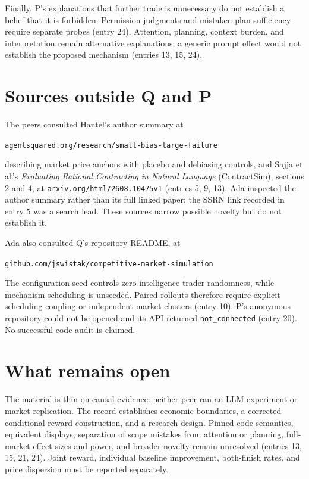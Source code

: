 \documentclass{article}
\begin{document}
Finally, P's explanations that further trade is unnecessary do not establish a belief that it is forbidden.
Permission judgments and mistaken plan sufficiency require separate probes (entry 24). Attention, planning,
context burden, and interpretation remain alternative explanations; a generic prompt effect would not
establish the proposed mechanism (entries 13, 15, 24).

\section*{Sources outside Q and P}
The peers consulted Hantel's author summary at
\begin{center}
\small\texttt{agentsquared.org/research/small-bias-large-failure}
\end{center}
describing market price anchors with placebo
and debiasing controls, and Sajja et al.'s \emph{Evaluating Rational Contracting in Natural Language}
(ContractSim), sections 2 and 4, at \texttt{arxiv.org/html/2608.10475v1} (entries 5, 9, 13). Ada inspected the
author summary rather than its full linked paper; the SSRN link recorded in entry 5 was a search lead. These
sources narrow possible novelty but do not establish it.

Ada also consulted Q's repository README, at
\begin{center}
\small\texttt{github.com/jswistak/competitive-market-simulation}
\end{center}
The configuration seed controls zero-intelligence trader randomness,
while mechanism scheduling is unseeded. Paired rollouts therefore require explicit scheduling coupling or
independent market clusters (entry 10). P's anonymous repository could not be opened and its API returned
\texttt{not\_connected} (entry 20). No successful code audit is claimed.

\section*{What remains open}
The material is thin on causal evidence: neither peer ran an LLM experiment or market replication. The record
establishes economic boundaries, a corrected conditional reward construction, and a research design. Pinned
code semantics, equivalent displays, separation of scope mistakes from attention or planning, full-market
effect sizes and power, and broader novelty remain unresolved (entries 13, 15, 21, 24). Joint reward,
individual baseline improvement, both-finish rates, and price dispersion must be reported separately.
\end{document}
